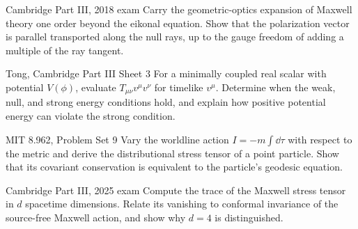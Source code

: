 \begin{exercise}{Cambridge Part III, 2018 exam}
Carry the geometric-optics expansion of Maxwell theory one order beyond the
eikonal equation.  Show that the polarization vector is parallel transported
along the null rays, up to the gauge freedom of adding a multiple of the ray
tangent.
\end{exercise}

\begin{exercise}{Tong, Cambridge Part III Sheet 3}
For a minimally coupled real scalar with potential \(V(\phi)\), evaluate
\(T_{\mu\nu}v^\mu v^\nu\) for timelike \(v^\mu\).  Determine when the weak,
null, and strong energy conditions hold, and explain how positive potential
energy can violate the strong condition.
\end{exercise}

\begin{exercise}{MIT 8.962, Problem Set 9}
Vary the worldline action \(I=-m\int\dd\tau\) with respect to the metric and
derive the distributional stress tensor of a point particle.  Show that its
covariant conservation is equivalent to the particle's geodesic equation.
\end{exercise}

\begin{exercise}{Cambridge Part III, 2025 exam}
Compute the trace of the Maxwell stress tensor in \(d\) spacetime dimensions.
Relate its vanishing to conformal invariance of the source-free Maxwell
action, and show why \(d=4\) is distinguished.
\end{exercise}
